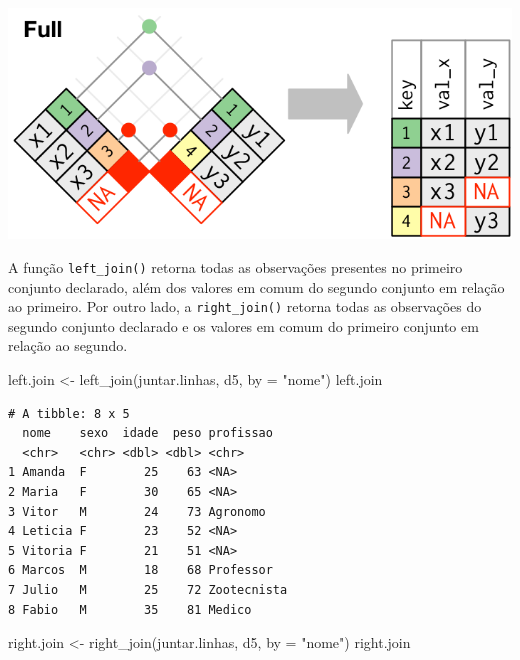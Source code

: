 \documentclass[
  brazilian,
]{book}
\newenvironment{Shaded}{\begin{snugshade}}{\end{snugshade}}
\newcommand{\AttributeTok}[1]{\textcolor[rgb]{0.77,0.63,0.00}{#1}}
\newcommand{\FunctionTok}[1]{\textcolor[rgb]{0.00,0.00,0.00}{#1}}
\newcommand{\NormalTok}[1]{#1}
\newcommand{\OtherTok}[1]{\textcolor[rgb]{0.56,0.35,0.01}{#1}}
\newcommand{\StringTok}[1]{\textcolor[rgb]{0.31,0.60,0.02}{#1}}
\let\origfigure\figure
\let\endorigfigure\endfigure
\renewenvironment{figure}[1][2] {
    \expandafter\origfigure\expandafter[H]
} {
    \endorigfigure
}
\begin{document}
\begin{figure}

{\centering \includegraphics[width=0.5\linewidth]{imagens/join-full} 

}

\caption{Esquematização da função $full_join$. Fonte: R for Data Science, 2017.}\label{fig:unnamed-chunk-175}
\end{figure}

A função \texttt{left\_join()} retorna todas as observações presentes no primeiro conjunto declarado, além dos valores em comum do segundo conjunto em relação ao primeiro. Por outro lado, a \texttt{right\_join()} retorna todas as observações do segundo conjunto declarado e os valores em comum do primeiro conjunto em relação ao segundo.

\begin{Shaded}
\begin{Highlighting}[]
\NormalTok{left.join }\OtherTok{\textless{}{-}} \FunctionTok{left\_join}\NormalTok{(juntar.linhas, d5, }\AttributeTok{by =} \StringTok{"nome"}\NormalTok{)}
\NormalTok{left.join}
\end{Highlighting}
\end{Shaded}

\begin{verbatim}
# A tibble: 8 x 5
  nome    sexo  idade  peso profissao  
  <chr>   <chr> <dbl> <dbl> <chr>      
1 Amanda  F        25    63 <NA>       
2 Maria   F        30    65 <NA>       
3 Vitor   M        24    73 Agronomo   
4 Leticia F        23    52 <NA>       
5 Vitoria F        21    51 <NA>       
6 Marcos  M        18    68 Professor  
7 Julio   M        25    72 Zootecnista
8 Fabio   M        35    81 Medico     
\end{verbatim}

\begin{Shaded}
\begin{Highlighting}[]
\NormalTok{right.join }\OtherTok{\textless{}{-}} \FunctionTok{right\_join}\NormalTok{(juntar.linhas, d5, }\AttributeTok{by =} \StringTok{"nome"}\NormalTok{)}
\NormalTok{right.join}
\end{Highlighting}
\end{Shaded}
\end{document}
